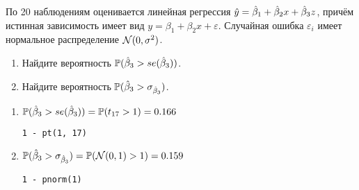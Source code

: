 \begin{problem}
По 20 наблюдениям оценивается линейная регрессия $\hat{y}=\hat{\beta}_1 +\hat{\beta}_2 x+\hat{\beta}_3 z$, причём истинная зависимость имеет вид $y=\beta_1 +\beta_2 x+\varepsilon$. Случайная ошибка $\varepsilon_i$ имеет нормальное распределение $\mathcal{N}(0,\sigma^2)$.

\begin{enumerate}
\item Найдите вероятность $\mathbb{P}(\hat{\beta}_3>se(\hat{\beta}_3))$.
\item Найдите вероятность $\mathbb{P}(\hat{\beta}_3>\sigma_{\hat{\beta}_3})$.
\end{enumerate}


\begin{sol}

\begin{enumerate}
\item $\mathbb{P}(\hat{\beta}_3>se(\hat{\beta}_3))=\mathbb{P}(t_{17}>1)=0.166$
\begin{verbatim}
1 - pt(1, 17)
\end{verbatim}

\item $\mathbb{P}(\hat{\beta}_3>\sigma_{\hat{\beta}_3})=\mathbb{P}(\mathcal{N}(0,1)>1)=0.159$
\begin{verbatim}
1 - pnorm(1)
\end{verbatim}
\end{enumerate}
\end{sol}
\end{problem}



